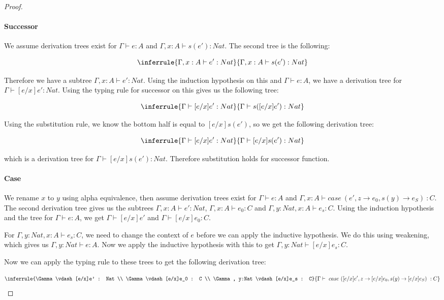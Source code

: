 \begin{proof}
\paragraph{Successor} We assume derivation trees exist for $\Gamma \vdash e : A$ and $\Gamma, x:A \vdash s(e') : Nat$. The second tree is the following:

$$\inferrule{\Gamma, x:A \vdash e' : Nat}{\Gamma, x:A \vdash s(e') : Nat}$$

Therefore we have a subtree $\Gamma, x:A \vdash e' : Nat$. Using the induction hypothesis on this and $\Gamma \vdash e : A$, we have a derivation tree for $\Gamma \vdash [e/x]e' : Nat$. Using the typing rule for successor on this gives us the following tree:

$$\inferrule{\Gamma \vdash [e/x]e' : Nat}{\Gamma \vdash s([e/x]e') : Nat}$$

Using the substitution rule, we know the bottom half is equal to $[e/x]s(e')$, so we get the following derivation tree:

 $$\inferrule{\Gamma \vdash [e/x]e' : Nat}{\Gamma \vdash [e/x]s(e') : Nat}$$
 
which is a derivation tree for $\Gamma \vdash [e/x]s(e') : Nat$. Therefore substitution holds for successor function.

\paragraph{Case} We rename $x$ to $y$ using alpha equivalence, then assume derivation trees exist for $\Gamma \vdash e : A$ and $\Gamma, x: A \vdash case \ (e', z \to e_0 , s(y) \to e_S) \  : C$. The second derivation tree gives us the subtrees $\Gamma, x:A \vdash e' : Nat$, $\Gamma, x : A \vdash e_0 : C$ and $\Gamma, y:Nat, x : A \vdash e_s : C$. Using the induction hypothesis and the tree for $\Gamma \vdash e : A$, we get  $\Gamma \vdash [e/x]e'$ and $\Gamma \vdash [e/x]e_0 : C$.

For $\Gamma, y:Nat, x : A \vdash e_s : C$, we need  to change the context of $e$ before we can apply the inductive hypothesis. We do this using weakening, which gives us $\Gamma, y:Nat \vdash e : A$. Now we apply the inductive hypothesis with this to get $\Gamma, y:Nat \vdash [e/x]e_s : C$.
 
 
Now we can apply the typing rule to these trees to get the following derivation tree:

$$\inferrule{\Gamma \vdash [e/x]e' : Nat \\  \Gamma \vdash [e/x]e_0 : C \\  \Gamma , y:Nat \vdash [e/x]e_s : C}  {\Gamma \vdash \ case \ ([e/x]e', z \to [e/x]e_0 , s(y) \to [e/x]e_S) \  : C}  
$$


\end{proof}
